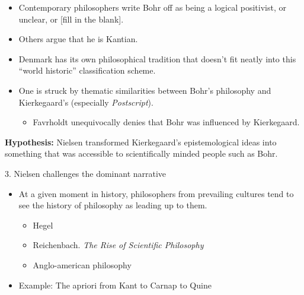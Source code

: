 \documentclass[ignorenonframetext, ]{beamer}
\begin{document}
\begin{frame}

\begin{itemize}
\item Contemporary philosophers write Bohr off as being a logical
  positivist, or unclear, or [fill in the blank].
\item Others argue that he is Kantian.
\item Denmark has its own philosophical tradition that doesn't fit
  neatly into this ``world historic'' classification scheme.
\item One is struck by thematic similarities between Bohr's philosophy
  and Kierkegaard's (especially \emph{Postscript}).
  \begin{itemize}
  \item Favrholdt unequivocally denies that Bohr was influenced by
    Kierkegaard.
  \end{itemize}
\end{itemize}
\end{frame}

\begin{frame}

  \textbf{Hypothesis:} Nielsen transformed Kierkegaard's
  epistemological ideas into something that was accessible to
  scientifically minded people such as Bohr.

  \vspace{2em}


\end{frame}

\begin{frame}{3. Nielsen challenges the dominant narrative}

\begin{itemize}
\item At a given moment in history, philosophers from prevailing
  cultures tend to see the history of philosophy as leading up to
  them.
  \begin{itemize}
  \item Hegel
  \item Reichenbach. \emph{The Rise of Scientific Philosophy}
  \item Anglo-american philosophy
  \end{itemize}
\item Example: The apriori from Kant to Carnap to Quine
\end{itemize}

\end{frame}
\end{document}
